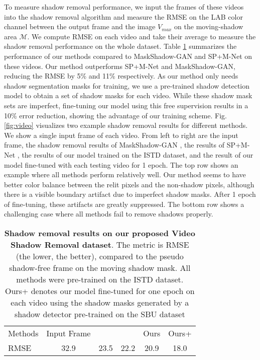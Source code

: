 \documentclass[runningheads]{llncs}
\def\mM{\mathcal{M}}
\begin{document}
To measure shadow removal performance, we input the frames of these videos into the shadow removal algorithm and measure the RMSE on the LAB color channel between the output frame and the image $V_{max}$ on the moving-shadow area $\mM$. We compute RMSE on each video and take their average to measure the shadow removal performance on the whole dataset. Table \ref{table:video} summarizes the performance of our methods compared to MaskShadow-GAN\cite{hu_iccv2019mask} and SP+M-Net\cite{Le-etal-ICCV19} on these videos. Our method outperforms SP+M-Net and MaskShadow-GAN, reducing the RMSE by 5\% and 11\% respectively. As our method only needs shadow segmentation masks for training, we use a pre-trained shadow detection model \cite{zhu18b} to obtain a set of shadow masks for each video. While these shadow mask sets are imperfect, fine-tuning our model using this free supervision results in  a 10\% error reduction, showing the advantage of our training scheme. Fig. \ref{fig:video} visualizes two example shadow removal results for different methods. We show a single input frame of each video. From left to right are the input frame, the shadow removal results of MaskShadow-GAN \cite{hu_iccv2019mask}, the results of SP+M-Net \cite{Le-etal-ICCV19}, the results of our model trained on the ISTD dataset, and the result of our model fine-tuned with each testing video for 1 epoch. The top row shows an example where all methods perform relatively well. Our method seems to have  better color balance between the relit pixels and the non-shadow pixels, although there is a visible boundary artifact due to imperfect shadow masks. After 1 epoch of fine-tuning, these artifacts are greatly suppressed. The bottom row shows a challenging case where all methods fail to remove shadows properly. 


\setlength{\tabcolsep}{4pt}
\begin{table}[t]
\begin{center}
\caption{\textbf{Shadow removal results on our proposed Video Shadow Removal dataset}. The metric is RMSE (the lower, the better), compared to the pseudo shadow-free frame on the moving shadow mask. All methods were pre-trained on the ISTD dataset.  Ours+ denotes our model fine-tuned for one epoch on each video using the shadow masks generated by a shadow detector \cite{zhu18b} pre-trained on the SBU dataset\cite{Vicente-et-al-CVPR16}}
\label{table:video}
\begin{tabular}{lccccc}
\hline\noalign{\smallskip}
Methods &Input Frame & \cite{hu_iccv2019mask}& \cite{Le-etal-ICCV19}& Ours & Ours+ \\ 
\noalign{\smallskip}
\midrule
\noalign{\smallskip}
RMSE  & 32.9 & 23.5 & 22.2 & 20.9 & 18.0\\
\hline
\end{tabular}
\end{center}
\end{table}
\end{document}
